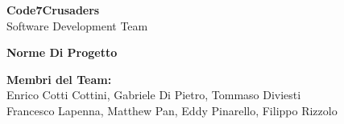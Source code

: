 \documentclass{article}
\begin{document}
\begin{titlepage}
    \vspace{1cm}
    
    {\Huge \textbf{Code7Crusaders}}\\
    \vspace{0.5cm}
    {\Large Software Development Team}\\
    \vspace{2cm}
    
    \large \textbf{Norme Di Progetto}
    \vspace{3.9cm}

    \textbf{Membri del Team:}\\
    Enrico Cotti Cottini, Gabriele Di Pietro, Tommaso Diviesti \\
    Francesco Lapenna, Matthew Pan, Eddy Pinarello, Filippo Rizzolo \\
    \vspace{0.5cm}
    
    \vspace{1cm}
\end{titlepage}
\end{document}
